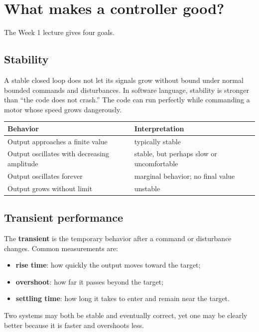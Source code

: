 \documentclass[11pt]{article}
\newcommand{\term}[1]{\textbf{#1}}
\begin{document}
\section{What makes a controller good?}

The Week 1 lecture gives four goals.

\subsection{Stability}

A stable closed loop does not let its signals grow without bound under normal bounded commands and disturbances. In software language, stability is stronger than ``the code does not crash.'' The code can run perfectly while commanding a motor whose speed grows dangerously.

\begin{center}
\begin{tabular}{p{}p{}}
\toprule
Behavior & Interpretation\\
\midrule
Output approaches a finite value & typically stable\\
Output oscillates with decreasing amplitude & stable, but perhaps slow or uncomfortable\\
Output oscillates forever & marginal behavior; no final value\\
Output grows without limit & unstable\\
\bottomrule
\end{tabular}
\end{center}

\subsection{Transient performance}

The \term{transient} is the temporary behavior after a command or disturbance changes. Common measurements are:

\begin{itemize}
  \item \term{rise time}: how quickly the output moves toward the target;
  \item \term{overshoot}: how far it passes beyond the target;
  \item \term{settling time}: how long it takes to enter and remain near the target.
\end{itemize}

Two systems may both be stable and eventually correct, yet one may be clearly better because it is faster and overshoots less.
\end{document}
